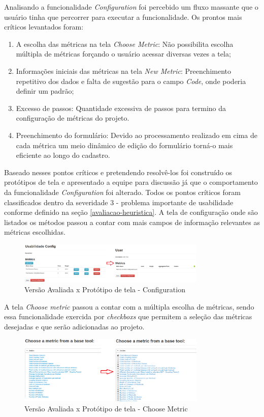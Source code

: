 Analisando a funcionalidade \textit{Configuration} foi percebido um fluxo massante que o usuário tinha que percorrer para executar a funcionalidade. Os prontos mais críticos levantados foram:

\begin{enumerate}
\item A escolha das métricas na tela \textit{Choose Metric}: Não possibilita escolha múltipla de métricas forçando o usuário acessar diversas vezes a tela;
\item Informações iniciais das métricas na tela \textit{New Metric}: Preenchimento repetitivo dos dados e falta de sugestão para o campo \textit{Code}, onde poderia definir um padrão;
\item Excesso de passos: Quantidade excessiva de passos para termino da configuração de métricas do projeto.
\item Preenchimento do formulário: Devido ao processamento realizado em cima de cada métrica um meio dinâmico de edição do formulário torná-o mais eficiente ao longo do cadastro.
\end{enumerate}

Baseado nesses pontos críticos e pretendendo resolvê-los foi construído os protótipos de tela e apresentado a equipe para discussão já que o comportamento da funcionalidade \textit{Configuration} foi alterado. Todos os pontos críticos foram classificados dentro da severidade 3 - problema importante de usabilidade conforme definido na seção \ref{avaliacao-heuristica}. A tela de configuração onde são listados os métodos passou a contar com mais campos de informação relevantes as métricas escolhidas.

\graphicspath{{figuras/}}
\begin{figure}[h]
\centering
\includegraphics[width=0.8\textwidth]{PrototipoConfig}
\caption{Versão Avaliada x Protótipo de tela - Configuration}
\label{parallel-coordinate}
\end{figure}

A tela \textit{Choose metric} passou a contar com a múltipla escolha de métricas, sendo essa funcionalidade exercida por \textit{checkboxs} que permitem a seleção das métricas desejadas e que serão adicionadas ao projeto.

\graphicspath{{figuras/}}
\begin{figure}[h]
\centering
\includegraphics[width=0.8\textwidth]{PrototipoChooseMetric}
\caption{Versão Avaliada x Protótipo de tela - Choose Metric}
\label{parallel-coordinate}
\end{figure}

